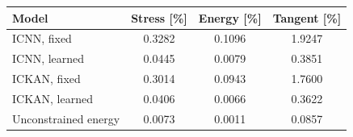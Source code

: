 \begin{tabular}{lccc}
\toprule
Model & Stress [\%] & Energy [\%] & Tangent [\%]\\
\midrule
ICNN, fixed & 0.3282 & 0.1096 & 1.9247\\
ICNN, learned & 0.0445 & 0.0079 & 0.3851\\
\addlinespace
ICKAN, fixed & 0.3014 & 0.0943 & 1.7600\\
ICKAN, learned & 0.0406 & 0.0066 & 0.3622\\
\midrule
Unconstrained energy & 0.0073 & 0.0011 & 0.0857\\
\bottomrule
\end{tabular}
